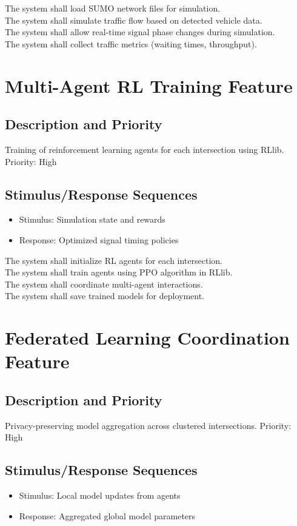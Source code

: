 \req The system shall load SUMO network files for simulation. \\
\req The system shall simulate traffic flow based on detected vehicle data. \\
\req The system shall allow real-time signal phase changes during simulation. \\
\req The system shall collect traffic metrics (waiting times, throughput).

\section{Multi-Agent RL Training Feature}

\subsection{Description and Priority}
Training of reinforcement learning agents for each intersection using RLlib. Priority: High

\subsection{Stimulus/Response Sequences}
\begin{itemize}
\item Stimulus: Simulation state and rewards
\item Response: Optimized signal timing policies
\end{itemize}

\req The system shall initialize RL agents for each intersection. \\
\req The system shall train agents using PPO algorithm in RLlib. \\
\req The system shall coordinate multi-agent interactions. \\
\req The system shall save trained models for deployment.

\section{Federated Learning Coordination Feature}

\subsection{Description and Priority}
Privacy-preserving model aggregation across clustered intersections. Priority: High

\subsection{Stimulus/Response Sequences}
\begin{itemize}
\item Stimulus: Local model updates from agents
\item Response: Aggregated global model parameters
\end{itemize}

